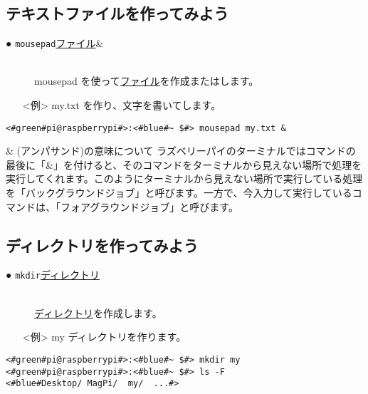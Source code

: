 \subsection{テキストファイルを作ってみよう}
\begin{description}
\item[● \texttt{mousepad}\textvisiblespace \underline{ファイル}\textvisiblespace \&]\mbox{}\\
mousepad を使って\underline{ファイル}を作成またはします。
\end{description}
\begin{itemize}
\item[<例>]my.txt を作り、文字を書いてします。
\end{itemize}
\begin{lstlisting}[caption=mousepadの例, label=mousepad]
<#green#pi@raspberrypi#>:<#blue#~ $#> mousepad my.txt &
\end{lstlisting}

\begin{itembox}[c]{\& (アンパサンド)の意味について}
    ラズベリーパイのターミナルではコマンドの最後に「\&」を付けると、そのコマンドをターミナルから見えない場所で処理を実行してくれます。このようにターミナルから見えない場所で実行している処理を「バックグラウンドジョブ」と呼びます。一方で、今入力して実行しているコマンドは、「フォアグラウンドジョブ」と呼びます。
\end{itembox}

\subsection{ディレクトリを作ってみよう}
\begin{description}
\item[● \texttt{mkdir}\textvisiblespace \underline{ディレクトリ}]\mbox{}\\
\underline{ディレクトリ}を作成します。
\end{description}
\begin{itemize}
\item[<例>]my ディレクトリを作ります。
\end{itemize}
\begin{lstlisting}[caption=mkdirの例, label=mkdir]
<#green#pi@raspberrypi#>:<#blue#~ $#> mkdir my
<#green#pi@raspberrypi#>:<#blue#~ $#> ls -F
<#blue#Desktop/	MagPi/	my/	 ...#>
\end{lstlisting}

